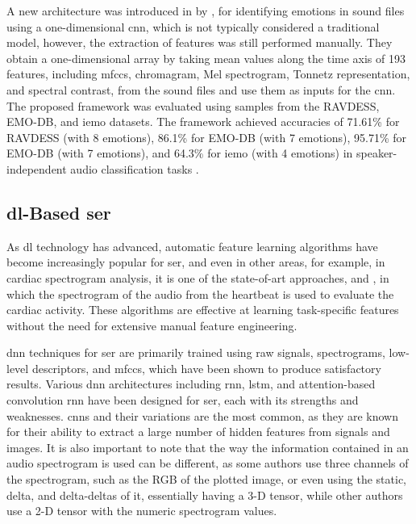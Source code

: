 A new architecture was introduced in \citeyear{Issa2020} by \citeauthor{Issa2020}, for identifying emotions in sound files using a one-dimensional \ac{cnn}, which is not typically considered a traditional model, however, the extraction of features was still performed manually. They obtain a one-dimensional array by taking mean values along the time axis of 193 features, including \ac{mfccs}, chromagram, Mel spectrogram, Tonnetz representation, and spectral contrast, from the sound files and use them as inputs for the \ac{cnn}. The proposed framework was evaluated using samples from the RAVDESS, EMO-DB, and \ac{iemo} datasets. The framework achieved accuracies of 71.61\% for RAVDESS (with 8 emotions), 86.1\% for EMO-DB (with 7 emotions), 95.71\% for EMO-DB (with 7 emotions), and 64.3\% for \ac{iemo} (with 4 emotions) in speaker-independent audio classification tasks \cite{Issa2020}.

\subsection{\acl{dl}-Based \ac{ser}}

As \ac{dl} technology has advanced, automatic feature learning algorithms have become increasingly popular for \ac{ser}, and even in other areas, for example, in cardiac spectrogram analysis, it is one of the state-of-art approaches, \cite{8759878} and \cite{Zhou2022}, in which the spectrogram of the audio from the heartbeat is used to evaluate the cardiac activity. These algorithms are effective at learning task-specific features without the need for extensive manual feature engineering.

\ac{dnn} techniques for \ac{ser} are primarily trained using raw signals, spectrograms, low-level descriptors, and \ac{mfccs}, which have been shown to produce satisfactory results. Various \ac{dnn} architectures including \ac{rnn}, \ac{lstm}, and attention-based convolution \ac{rnn} have been designed for \ac{ser}, each with its strengths and weaknesses. \acp{cnn} and their variations are the most common, as they are known for their ability to extract a large number of hidden features from signals and images. It is also important to note that the way the information contained in an audio spectrogram is used can be different, as some authors use three channels of the spectrogram, such as the RGB of the plotted image, or even using the static, delta, and delta-deltas of it, essentially having a 3-D tensor, while other authors use a 2-D tensor with the numeric spectrogram values.

